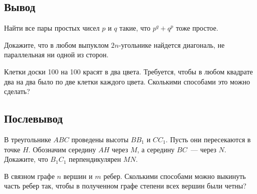 \subsection*{Вывод}

\begin{problems}

\item
Найти все пары простых чисел $p$ и $q$ такие, что $p^q + q^p$ тоже простое.

\item
Докажите, что в любом выпуклом $2n$-угольнике найдется диагональ, не
параллельная ни одной из сторон.

\item
Клетки доски 100 на 100 красят в два цвета.
Требуется, чтобы в любом квадрате два на два было по две клетки каждого цвета.
Сколькими способами это можно сделать?

\end{problems}


\subsection*{Послевывод}

\begin{problems}

\item
В треугольнике $ABC$ проведены высоты $B B_1$ и $C C_1$.
Пусть они пересекаются в точке $H$.
Обозначим середину $AH$ через $M$, а середину $BC$~--- через $N$.
Докажите, что $B_1 C_1$ перпендикулярен $MN$.

\item
В связном графе $n$ вершин и $m$ ребер.
Сколькими способами можно выкинуть часть ребер так, чтобы в полученном графе
степени всех вершин были четны?

\end{problems}

